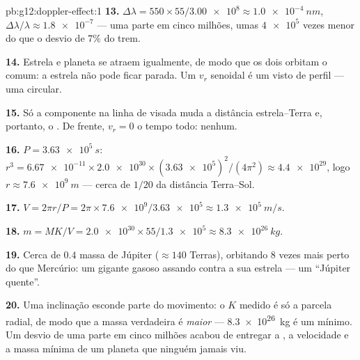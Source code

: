 \begin{solution}{pb:g12:doppler-effect:1}
\textbf{13.} $\Delta\lambda = 550 \times 55/\num{3.00e8} \approx
\qty{1.0e-4}{nm}$, $\Delta\lambda/\lambda \approx \num{1.8e-7}$ --- uma
parte em cinco milhões, umas $\num{4e5}$ vezes menor do que o desvio de
$7\%$ do trem.

\textbf{14.} Estrela e planeta se atraem igualmente, de modo que os dois
orbitam o  comum: a estrela não pode ficar parada. Um
$v_r$ senoidal é um  visto de perfil --- uma
 circular.

\textbf{15.} Só a componente na linha de visada muda a distância
estrela--Terra e, portanto, o . De frente,
$v_r = 0$ o tempo todo:  nenhum.

\textbf{16.} $P = \qty{3.63e5}{s}$:
$r^3 = \num{6.67e-11} \times \num{2.0e30} \times
(\num{3.63e5})^2/(4\pi^2) \approx \num{4.4e29}$, logo
$r \approx \qty{7.6e9}{m}$ --- cerca de $1/20$ da distância Terra--Sol.

\textbf{17.} $V = 2\pi r/P = 2\pi \times \num{7.6e9}/\num{3.63e5}
\approx \qty{1.3e5}{m/s}$.

\textbf{18.} $m = M K/V = \num{2.0e30} \times 55/\num{1.3e5} \approx
\qty{8.3e26}{kg}$.

\textbf{19.} Cerca de $0.4$ massa de Júpiter ($\approx 140$ Terras),
orbitando $8$ vezes mais perto do que Mercúrio: um gigante gasoso
assando contra a sua estrela --- um ``Júpiter quente''.

\textbf{20.} Uma inclinação esconde parte do movimento: o $K$ medido é só
a parcela radial, de modo que a massa verdadeira é \emph{maior} ---
\qty{8.3e26}{kg} é um mínimo. Um desvio  de uma parte em cinco
milhões acabou de entregar a , a velocidade e a massa mínima de um
planeta que ninguém jamais viu.
\end{solution}
